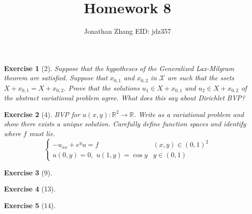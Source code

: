 \documentclass[letterpaper,twoside,11pt]{article}
\theoremstyle{mystyle}
\newtheorem*{exercise}{Exercise}
\newcommand{\R}{{\mathbb R}}
\begin{document}
\title{\vspace{-2\baselineskip} 
Homework 8
}
\author{Jonathan Zhang \qquad EID: { jdz357} }
\date{}
\maketitle

\begin{exercise}[2]
  Suppose that the hypotheses of the Generalized Lax-Milgram theorem are satisfied. Suppose that $x_{0,1}$ and $x_{0,2}$ in $\mathcal X$ are such that the ssets $X + x_{0,1} = X + x_{0,2}$. Prove that the solutions $u_1 \in X + x_{0,1}$ and $u_2 \in X + x_{0,2}$ of the abstract variational problem agree. What does this say about Dirichlet BVP? 
\end{exercise}


\begin{exercise}[4]
BVP for $u (x,y) : \R^2 \to \R$. Write as a variational problem and show there exists a unique solution. Carefully define function spaces and identify where $f$ must lie. 
\[\left\{ {\begin{array}{*{20}{c}}
  { - {u_{xx}} + {e^y}u = f}&{\left( {x,y} \right) \in {{\left( {0,1} \right)}^2}} \\ 
  {u\left( {0,y} \right) = 0,\,\,u\left( {1,y} \right) = \cos y}&{y \in \left( {0,1} \right)} 
\end{array}} \right.\]
\end{exercise}


\begin{exercise}[9]

\end{exercise}


\begin{exercise}[13]

\end{exercise}


\begin{exercise}[14]

\end{exercise}
\end{document}
